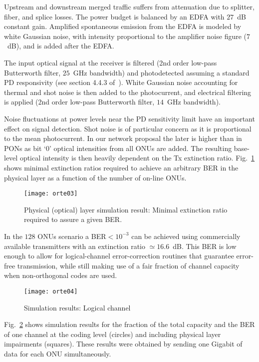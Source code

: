 \documentclass[10pt]{article}
\begin{document}
Upstream and downstream merged traffic suffers from attenuation due to
splitter, fiber, and
splice losses. The power budget is balanced by an EDFA with $27$~dB constant gain.
Amplified spontaneous emission from the EDFA is modeled by white Gaussian
noise, with intensity proportional to the amplifier noise figure ($7$~dB), and is added
after the EDFA. 


The input optical signal at the receiver is filtered (2nd order low-pass Butterworth filter, $25$~GHz bandwidth) and photodetected assuming a standard PD responsivity (see section 4.4.3 of~\cite{Agrawal:xx}).
White Gaussian noise accounting for thermal and shot noise is then added
to the photocurrent, and 
electrical filtering is applied (2nd order low-pass Butterworth filter, $14$~GHz bandwidth).

Noise fluctuations at power levels near the PD sensitivity limit have an important effect on signal detection. 
Shot noise is of particular concern as it is proportional to the mean photocurrent.
In our network proposal the later is higher than in PONs as bit
`0' optical intensities from all ONUs are added.
The resulting base-level optical intensity is then heavily dependent on the Tx extinction ratio.
Fig.~\ref{sim:optical} shows minimal extinction ratios required to
achieve an arbitrary BER in the physical layer as a function of the
number of on-line ONUs.
\begin{figure}[!t]
    \centering
      \texttt{[image: orte03]}
      \caption{Physical (optical) layer simulation result: Minimal extinction ratio required to assure a given BER.}
      \label{sim:optical}
\end{figure}
In the $128$ ONUs scenario a  BER$<10^{-3}$ can be achieved using
commercially available transmitters with an extinction ratio $\simeq16.6$~dB.
This BER is low enough to allow for logical-channel error-correction routines that guarantee error-free transmission, while still making use of a fair fraction of channel capacity when non-orthogonal codes are used.
\begin{figure}[!t]
    \centering
      \texttt{[image: orte04]}
    \caption{Simulation results: Logical channel}
      \label{sim:access}
\end{figure}
Fig.~\ref{sim:access} shows simulation results for the fraction of the total
capacity and the BER of one channel at the coding level (circles) and 
including physical layer impairments (squares). These results were obtained by
sending one Gigabit of data for each ONU simultaneously.
\end{document}
